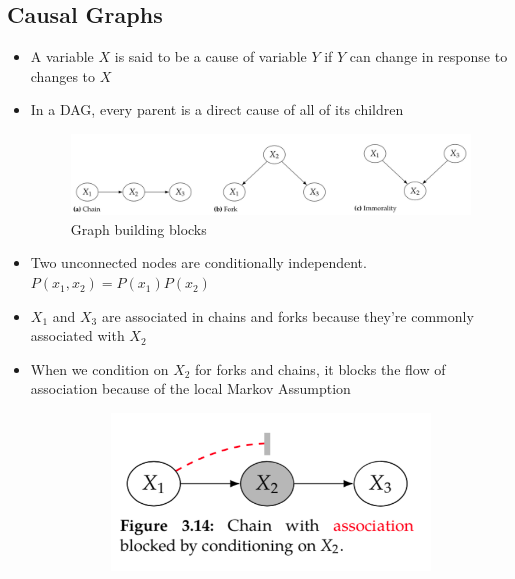 \documentclass[../main.tex]{subfiles}
\begin{document}
  \subsection{Causal Graphs}
    \begin{itemize}
      \item A variable $X$ is said to be a cause of variable $Y$ if $Y$ can change in response to changes to $X$
      \item In a DAG, every parent is a direct cause of all of its children
      \begin{figure}[h]
        \caption{Graph building blocks}
        \centering
        \includegraphics[width=1\textwidth]{../imgs/graph_blocks.png}
      \end{figure}
      \item Two unconnected nodes are conditionally independent. $P(x_{1}, x_{2}) = P(x_{1})P(x_{2})$
      \item $X_{1}$ and $X_{3}$ are associated in chains and forks because they're commonly associated with $X_{2}$
      \item When we condition on $X_{2}$ for forks and chains, it blocks the flow of association because of the local Markov Assumption
      \begin{figure}[h]
        \caption{Causal graphical models}
        \centering
        \begin{subfigure}{.33\textwidth}
          \centering
          \includegraphics[width=0.8\linewidth]{../imgs/chain_block.png}
          \label{fig:chain_block}
        \end{subfigure}%
        \begin{subfigure}{.33\textwidth}
          \centering

\end{subfigure}
\end{figure}
\end{itemize}
\end{document}
